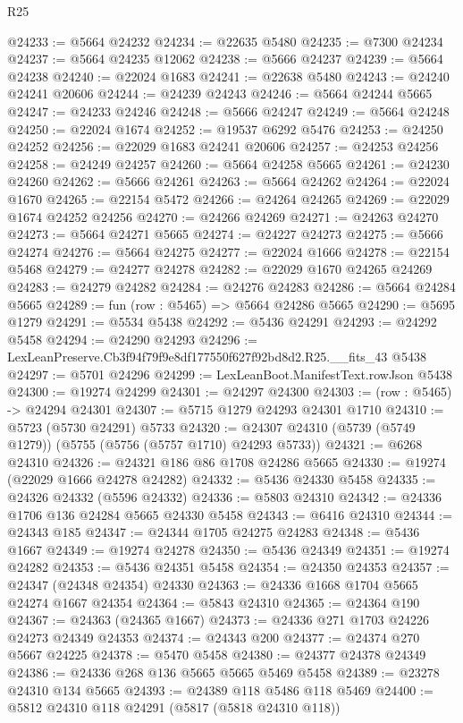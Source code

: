 \begin{lexlean}{R25}
\begin{coremodule}
@24233 := @5664 @24232
@24234 := @22635 @5480
@24235 := @7300 @24234
@24237 := @5664 @24235 @12062
@24238 := @5666 @24237
@24239 := @5664 @24238
@24240 := @22024 @1683
@24241 := @22638 @5480
@24243 := @24240 @24241 @20606
@24244 := @24239 @24243
@24246 := @5664 @24244 @5665
@24247 := @24233 @24246
@24248 := @5666 @24247
@24249 := @5664 @24248
@24250 := @22024 @1674
@24252 := @19537 @6292 @5476
@24253 := @24250 @24252
@24256 := @22029 @1683 @24241 @20606
@24257 := @24253 @24256
@24258 := @24249 @24257
@24260 := @5664 @24258 @5665
@24261 := @24230 @24260
@24262 := @5666 @24261
@24263 := @5664 @24262
@24264 := @22024 @1670
@24265 := @22154 @5472
@24266 := @24264 @24265
@24269 := @22029 @1674 @24252 @24256
@24270 := @24266 @24269
@24271 := @24263 @24270
@24273 := @5664 @24271 @5665
@24274 := @24227 @24273
@24275 := @5666 @24274
@24276 := @5664 @24275
@24277 := @22024 @1666
@24278 := @22154 @5468
@24279 := @24277 @24278
@24282 := @22029 @1670 @24265 @24269
@24283 := @24279 @24282
@24284 := @24276 @24283
@24286 := @5664 @24284 @5665
@24289 := fun (row : @5465) => @5664 @24286 @5665
@24290 := @5695 @1279
@24291 := @5534 @5438
@24292 := @5436 @24291
@24293 := @24292 @5458
@24294 := @24290 @24293
@24296 := LexLeanPreserve.Cb3f94f79f9e8df177550f627f92bd8d2.R25.__fits_43 @5438
@24297 := @5701 @24296
@24299 := LexLeanBoot.ManifestText.rowJson @5438
@24300 := @19274 @24299
@24301 := @24297 @24300
@24303 := (row : @5465) -> @24294 @24301
@24307 := @5715 @1279 @24293 @24301 @1710
@24310 := @5723 (@5730 @24291) @5733
@24320 := @24307 @24310 (@5739 (@5749 @1279)) (@5755 (@5756 (@5757 @1710) @24293 @5733))
@24321 := @6268 @24310
@24326 := @24321 @186 @86 @1708 @24286 @5665
@24330 := @19274 (@22029 @1666 @24278 @24282)
@24332 := @5436 @24330 @5458
@24335 := @24326 @24332 (@5596 @24332)
@24336 := @5803 @24310
@24342 := @24336 @1706 @136 @24284 @5665 @24330 @5458
@24343 := @6416 @24310
@24344 := @24343 @185
@24347 := @24344 @1705 @24275 @24283
@24348 := @5436 @1667
@24349 := @19274 @24278
@24350 := @5436 @24349
@24351 := @19274 @24282
@24353 := @5436 @24351 @5458
@24354 := @24350 @24353
@24357 := @24347 (@24348 @24354) @24330
@24363 := @24336 @1668 @1704 @5665 @24274 @1667 @24354
@24364 := @5843 @24310
@24365 := @24364 @190
@24367 := @24363 (@24365 @1667)
@24373 := @24336 @271 @1703 @24226 @24273 @24349 @24353
@24374 := @24343 @200
@24377 := @24374 @270 @5667 @24225
@24378 := @5470 @5458
@24380 := @24377 @24378 @24349
@24386 := @24336 @268 @136 @5665 @5665 @5469 @5458
@24389 := @23278 @24310 @134 @5665
@24393 := @24389 @118 @5486 @118 @5469
@24400 := @5812 @24310 @118 @24291 (@5817 (@5818 @24310 @118))

\end{coremodule}
\end{lexlean}
